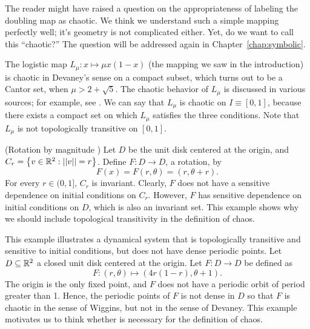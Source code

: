 \documentclass[10pt,draft,twoside]{book}
\begin{document}
The reader might have raised a question on the appropriateness of labeling the doubling map as chaotic.
We think we understand such a simple mapping perfectly well; it's geometry is not complicated either.
Yet, do we want to call this ``chaotic?''
The question will be addressed again in Chapter~\ref{chap:symbolic}.
\begin{example}
  The logistic map $L_\mu: x \mapsto \mu x(1-x)$ (the mapping we saw in the introduction) is chaotic in Devaney's sense on a compact subset, which turns out to be a Cantor set, when $\mu > 2 + \sqrt{5}$.
  The chaotic behavior of $L_\mu$ is discussed in various sources; for example, see \citet{sternberg}.
  We can say that $L_\mu$ is chaotic on $I \equiv [0,1]$, because there exists a compact set on which $L_\mu$ satisfies the three conditions.
  Note that $L_\mu$ is not topologically transitive on $[0,1]$.
\end{example} 
\begin{example}
  (Rotation by magnitude \citep{martelli})
  Let $D$ be the unit disk centered at the origin, and $C_r = \left \{ v \in \mathbb{R}^2: \left|\left| v \right|\right| = r \right \}$.
  Define $F: D \to D$, a rotation, by 
  \begin{equation*}
    F(x) = F(r, \theta) = (r, \theta + r).
  \end{equation*}
For every $r \in (0,1]$, $C_r$ is invariant.
Clearly, $F$ does not have a sensitive dependence on initial conditions on $C_r$.
However, $F$ has sensitive dependence on initial conditions on $D$, which is also an invariant set. 
This example shows why we should include topological transitivity in the definition of chaos.
\end{example}
\begin{example}
  \citep{martelli}
  This example illustrates a dynamical system that is topologically transitive and sensitive to initial conditions, but does not have dense periodic points.
  Let $D \subseteq \mathbb{R}^2$ a closed unit disk centered at the origin.
  Let $F: D \to D$ be defined as
  \begin{equation*}
    F: (r, \theta) \mapsto (4r(1 - r), \theta + 1).
  \end{equation*}
  The origin is the only fixed point, and $F$ does not have a periodic orbit of period greater than 1.
  Hence, the periodic points of $F$ is not dense in $D$ so that $F$ is chaotic in the sense of Wiggins, but not in the sense of Devaney.
  This example motivates us to think whether \dpp is necessary for the definition of chaos.
  \label{eg:notdpp}
\end{example}
\end{document}
